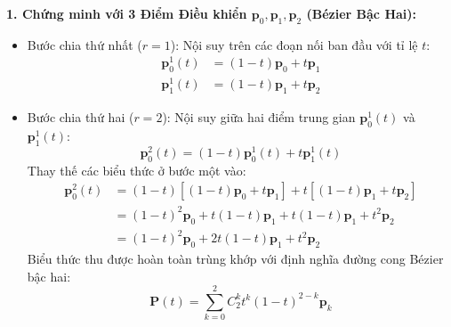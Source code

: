 \textbf{1. Chứng minh với 3 Điểm Điều khiển $\mathbf{p}_0, \mathbf{p}_1, \mathbf{p}_2$ (Bézier Bậc Hai):}
\begin{itemize}
    \item Bước chia thứ nhất ($r = 1$): Nội suy trên các đoạn nối ban đầu với tỉ lệ $t$:
    \begin{align}
    \mathbf{p}_0^1(t) &= (1 - t) \mathbf{p}_0 + t \mathbf{p}_1 \\
    \mathbf{p}_1^1(t) &= (1 - t) \mathbf{p}_1 + t \mathbf{p}_2
    \end{align}
    \item Bước chia thứ hai ($r = 2$): Nội suy giữa hai điểm trung gian $\mathbf{p}_0^1(t)$ và $\mathbf{p}_1^1(t)$:
    \begin{equation}
    \mathbf{p}_0^2(t) = (1 - t) \mathbf{p}_0^1(t) + t \mathbf{p}_1^1(t)
    \end{equation}
    Thay thế các biểu thức ở bước một vào:
    \begin{align}
    \mathbf{p}_0^2(t) &= (1 - t)[(1 - t) \mathbf{p}_0 + t \mathbf{p}_1] + t[(1 - t) \mathbf{p}_1 + t \mathbf{p}_2] \nonumber \\
    &= (1 - t)^2 \mathbf{p}_0 + t(1 - t) \mathbf{p}_1 + t(1 - t) \mathbf{p}_1 + t^2 \mathbf{p}_2 \nonumber \\
    &= (1 - t)^2 \mathbf{p}_0 + 2t(1 - t) \mathbf{p}_1 + t^2 \mathbf{p}_2
    \end{align}
    Biểu thức thu được hoàn toàn trùng khớp với định nghĩa đường cong Bézier bậc hai:
    \begin{equation}
    \mathbf{P}(t) = \sum_{k=0}^2 C_2^k t^k (1 - t)^{2-k} \mathbf{p}_k
    \end{equation}
\end{itemize}

